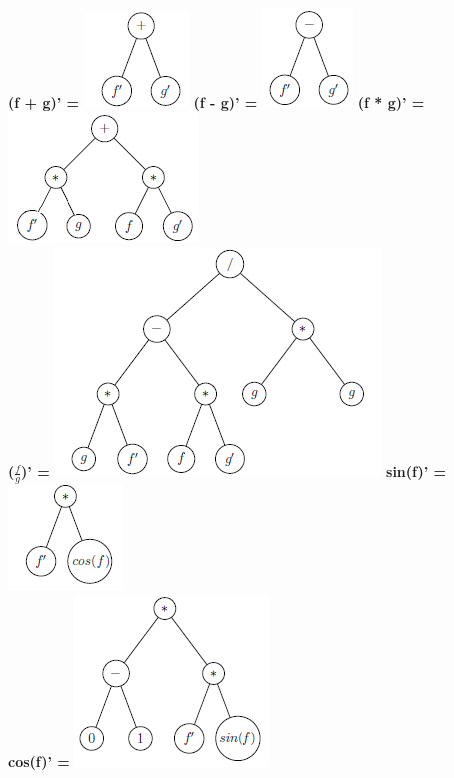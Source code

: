 \documentclass[10pt,a4paper]{article}
\begin{document}
\textbf{(f + g)' =} \includegraphics[scale=1]{q9-f+g.png}
\textbf{(f - g)' =} \includegraphics[scale=1]{q9-f-g.png}
\textbf{(f * g)' =} \includegraphics[scale=1]{q9-fg.png} \\
\textbf{($\frac{f}{g}$)' =} \includegraphics[scale=1]{q9-fdivg.png}
\textbf{sin(f)' =} \includegraphics[scale=1]{q9-sinf.png} \\
\textbf{cos(f)' =} \includegraphics[scale=1]{q9-cosf.png}
\end{document}
